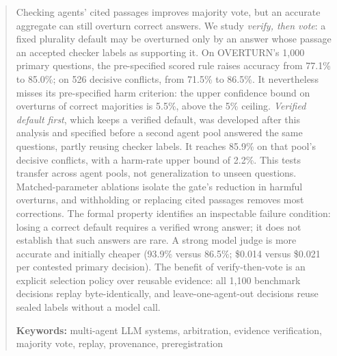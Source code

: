 \begin{abstract}
Checking agents' cited passages improves majority vote, but an accurate aggregate can still overturn correct answers. We study \emph{verify, then vote}: a fixed plurality default may be overturned only by an answer whose passage an accepted checker labels as supporting it. On OVERTURN's 1,000 primary questions, the pre-specified scored rule raises accuracy from 77.1\% to 85.0\%; on 526 decisive conflicts, from 71.5\% to 86.5\%. It nevertheless misses its pre-specified harm criterion: the upper confidence bound on overturns of correct majorities is 5.5\%, above the 5\% ceiling. \emph{Verified default first}, which keeps a verified default, was developed after this analysis and specified before a second agent pool answered the same questions, partly reusing checker labels. It reaches 85.9\% on that pool's decisive conflicts, with a harm-rate upper bound of 2.2\%. This tests transfer across agent pools, not generalization to unseen questions. Matched-parameter ablations isolate the gate's reduction in harmful overturns, and withholding or replacing cited passages removes most corrections. The formal property identifies an inspectable failure condition: losing a correct default requires a verified wrong answer; it does not establish that such answers are rare. A strong model judge is more accurate and initially cheaper (93.9\% versus 86.5\%; \$0.014 versus \$0.021 per contested primary decision). The benefit of verify-then-vote is an explicit selection policy over reusable evidence: all 1,100 benchmark decisions replay byte-identically, and leave-one-agent-out decisions reuse sealed labels without a model call.

\medskip
\noindent\textbf{Keywords:} multi-agent LLM systems, arbitration, evidence verification, majority vote, replay, provenance, preregistration
\end{abstract}

